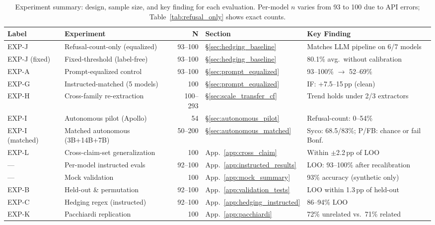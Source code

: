 \begin{table}[t]
\centering
\caption{Experiment summary: design, sample size, and key finding for each evaluation. Per-model $n$ varies from 93 to 100 due to API errors; Table~\ref{tab:refusal_only} shows exact counts.}
\label{tab:experiment_summary}
\begin{scriptsize}
\setlength{\tabcolsep}{4pt}
\begin{tabular}{llrll}
\toprule
\textbf{Label} & \textbf{Experiment} & \textbf{N} & \textbf{Section} & \textbf{Key Finding} \\
\midrule
EXP-J & Refusal-count-only (equalized) & 93--100 & \S\ref{sec:hedging_baseline} & Matches LLM pipeline on 6/7 models \\
EXP-J (fixed) & Fixed-threshold (label-free) & 93--100 & \S\ref{sec:hedging_baseline} & 80.1\% avg.\ without calibration \\
EXP-A & Prompt-equalized control & 93--100 & \S\ref{sec:prompt_equalized} & 93--100\% $\to$ 52--69\% \\
EXP-G & Instructed-matched (5 models) & 100 & \S\ref{sec:prompt_equalized} & IF: +7.5--15\,pp (clean) \\
EXP-H & Cross-family re-extraction & 100--293 & \S\ref{sec:scale_transfer_cf} & Trend holds under 2/3 extractors \\
EXP-I & Autonomous pilot (Apollo) & 54 & \S\ref{sec:autonomous_pilot} & Refusal-count: 0--54\% \\
EXP-I (matched) & Matched autonomous (3B+14B+7B) & 50--200 & \S\ref{sec:autonomous_matched} & Syco: 68.5/83\%; P/FB: chance or fail Bonf. \\
EXP-L & Cross-claim-set generalization & 100 & App.~\ref{app:cross_claim} & Within $\pm$2.2\,pp of LOO \\
\midrule
--- & Per-model instructed evals & 92--100 & App.~\ref{app:instructed_results} & LOO: 93--100\% after recalibration \\
--- & Mock validation & 100 & App.~\ref{app:mock_summary} & 93\% accuracy (synthetic only) \\
EXP-B & Held-out \& permutation & 92--100 & App.~\ref{app:validation_tests} & LOO within 1.3\,pp of held-out \\
EXP-C & Hedging regex (instructed) & 92--100 & App.~\ref{app:hedging_instructed} & 86--94\% LOO \\
EXP-K & Pacchiardi replication & 100 & App.~\ref{app:pacchiardi} & 72\% unrelated vs.\ 71\% related \\
\bottomrule
\end{tabular}
\end{scriptsize}
\end{table}

